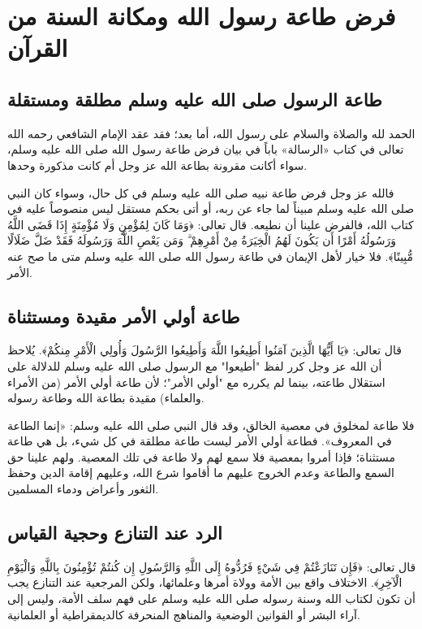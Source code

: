 \chapter{فرض طاعة رسول الله ومكانة السنة من القرآن}

\section{طاعة الرسول صلى الله عليه وسلم مطلقة ومستقلة}
الحمد لله والصلاة والسلام على رسول الله، أما بعد؛ فقد عقد الإمام الشافعي رحمه الله تعالى في كتاب «الرسالة» باباً في بيان فرض طاعة رسول الله صلى الله عليه وسلم، سواء أكانت مقرونة بطاعة الله عز وجل أم كانت مذكورة وحدها.

فالله عز وجل فرض طاعة نبيه صلى الله عليه وسلم في كل حال، وسواء كان النبي صلى الله عليه وسلم مبيناً لما جاء عن ربه، أو أتى بحكم مستقل ليس منصوصاً عليه في كتاب الله، فالفرض علينا أن نطيعه. قال تعالى: ﴿وَمَا كَانَ لِمُؤْمِنٍ وَلَا مُؤْمِنَةٍ إِذَا قَضَى اللَّهُ وَرَسُولُهُ أَمْرًا أَن يَكُونَ لَهُمُ الْخِيَرَةُ مِنْ أَمْرِهِمْ ۗ وَمَن يَعْصِ اللَّهَ وَرَسُولَهُ فَقَدْ ضَلَّ ضَلَالًا مُّبِينًا﴾. فلا خيار لأهل الإيمان في طاعة رسول الله صلى الله عليه وسلم متى ما صح عنه الأمر.

\section{طاعة أولي الأمر مقيدة ومستثناة}
قال تعالى: ﴿يَا أَيُّهَا الَّذِينَ آمَنُوا أَطِيعُوا اللَّهَ وَأَطِيعُوا الرَّسُولَ وَأُولِي الْأَمْرِ مِنكُمْ﴾. يُلاحظ أن الله عز وجل كرر لفظ "أطيعوا" مع الرسول صلى الله عليه وسلم للدلالة على استقلال طاعته، بينما لم يكرره مع "أولي الأمر"؛ لأن طاعة أولي الأمر (من الأمراء والعلماء) مقيدة بطاعة الله وطاعة رسوله.

فلا طاعة لمخلوق في معصية الخالق، وقد قال النبي صلى الله عليه وسلم: «إنما الطاعة في المعروف». فطاعة أولي الأمر ليست طاعة مطلقة في كل شيء، بل هي طاعة مستثناة؛ فإذا أمروا بمعصية فلا سمع لهم ولا طاعة في تلك المعصية. ولهم علينا حق السمع والطاعة وعدم الخروج عليهم ما أقاموا شرع الله، وعليهم إقامة الدين وحفظ الثغور وأعراض ودماء المسلمين. 

\section{الرد عند التنازع وحجية القياس}
قال تعالى: ﴿فَإِن تَنَازَعْتُمْ فِي شَيْءٍ فَرُدُّوهُ إِلَى اللَّهِ وَالرَّسُولِ إِن كُنتُمْ تُؤْمِنُونَ بِاللَّهِ وَالْيَوْمِ الْآخِرِ﴾. الاختلاف واقع بين الأمة وولاة أمرها وعلمائها، ولكن المرجعية عند التنازع يجب أن تكون لكتاب الله وسنة رسوله صلى الله عليه وسلم على فهم سلف الأمة، وليس إلى آراء البشر أو القوانين الوضعية والمناهج المنحرفة كالديمقراطية أو العلمانية.

